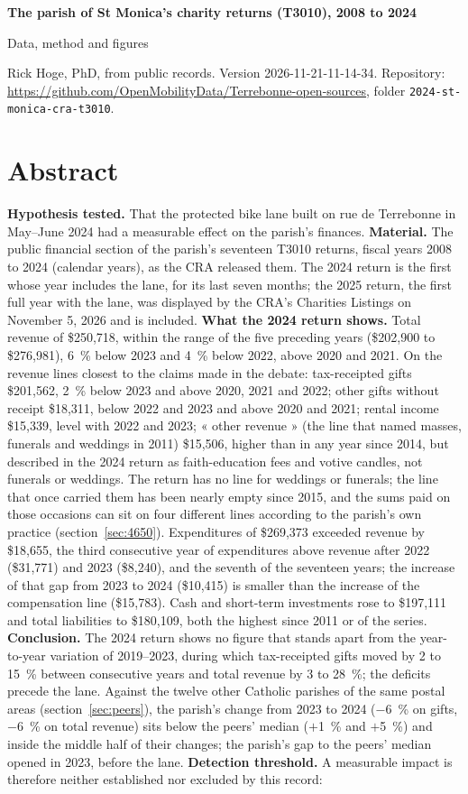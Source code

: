 \documentclass[11pt,letterpaper]{article}
\newcommand{\docversion}{2026-11-21-11-14-34} %
\newcommand{\repourl}{https://github.com/OpenMobilityData/Terrebonne-open-sources}
\newcommand{\folder}{2024-st-monica-cra-t3010}
\begin{document}
{\LARGE\bfseries The parish of St Monica's charity returns (T3010), 2008 to 2024}\par\medskip
{\large Data, method and figures}\par\medskip
{\small Rick Hoge, PhD, from public records. Version \docversion. Repository: \href{\repourl}{\repourl}, folder \texttt{\folder}.}

\section*{Abstract}

\textbf{Hypothesis tested.} That the protected bike lane built on rue de Terrebonne in May--June 2024 had a measurable effect on the parish's finances. \textbf{Material.} The public financial section of the parish's seventeen T3010 returns, fiscal years 2008 to 2024 (calendar years), as the CRA released them. The 2024 return is the first whose year includes the lane, for its last seven months; the 2025 return, the first full year with the lane, was displayed by the CRA's Charities Listings on November 5, 2026 and is included. \textbf{What the 2024 return shows.} Total revenue of \$250,718, within the range of the five preceding years (\$202,900 to \$276,981), 6~\% below 2023 and 4~\% below 2022, above 2020 and 2021. On the revenue lines closest to the claims made in the debate: tax-receipted gifts \$201,562, 2~\% below 2023 and above 2020, 2021 and 2022; other gifts without receipt \$18,311, below 2022 and 2023 and above 2020 and 2021; rental income \$15,339, level with 2022 and 2023; « other revenue » (the line that named masses, funerals and weddings in 2011) \$15,506, higher than in any year since 2014, but described in the 2024 return as faith-education fees and votive candles, not funerals or weddings. The return has no line for weddings or funerals; the line that once carried them has been nearly empty since 2015, and the sums paid on those occasions can sit on four different lines according to the parish's own practice (section~\ref{sec:4650}). Expenditures of \$269,373 exceeded revenue by \$18,655, the third consecutive year of expenditures above revenue after 2022 (\$31,771) and 2023 (\$8,240), and the seventh of the seventeen years; the increase of that gap from 2023 to 2024 (\$10,415) is smaller than the increase of the compensation line (\$15,783). Cash and short-term investments rose to \$197,111 and total liabilities to \$180,109, both the highest since 2011 or of the series. \textbf{Conclusion.} The 2024 return shows no figure that stands apart from the year-to-year variation of 2019--2023, during which tax-receipted gifts moved by 2 to 15~\% between consecutive years and total revenue by 3 to 28~\%; the deficits precede the lane. Against the twelve other Catholic parishes of the same postal areas (section~\ref{sec:peers}), the parish's change from 2023 to 2024 ($-$6~\% on gifts, $-$6~\% on total revenue) sits below the peers' median ($+$1~\% and $+$5~\%) and inside the middle half of their changes; the parish's gap to the peers' median opened in 2023, before the lane. \textbf{Detection threshold.}  A measurable impact is therefore neither established nor excluded by this record: 
\end{document}
